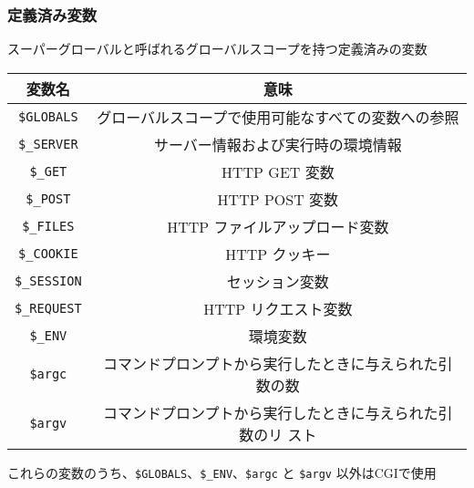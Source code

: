 \begin{frame}[containsverbatim]
\frametitle{定義済み変数}
スーパーグローバルと呼ばれるグローバルスコープを持つ定義済みの変数
\begin{center}\small
 \begin{tabular}{|c|c|}\hline
  変数名& 意味\\\hline
\verb+$GLOBALS+ & グローバルスコープで使用可能なすべての変数への参照\\\hline
\verb+$_SERVER+ & サーバー情報および実行時の環境情報\\\hline
\verb+$_GET+ & HTTP GET 変数\\\hline
\verb+$_POST+ & HTTP POST 変数\\\hline
\verb+$_FILES+ & HTTP ファイルアップロード変数\\\hline
\verb+$_COOKIE+ & HTTP クッキー\\\hline
\verb+$_SESSION+ &セッション変数 \\\hline
\verb+$_REQUEST+ & HTTP リクエスト変数\\\hline
\verb+$_ENV+  &  環境変数\\\hline
\verb+$argc+  &  コマンドプロンプトから実行したときに与えられた引数の数\\\hline
\verb+$argv+  &  コマンドプロンプトから実行したときに与えられた引数のリ
      スト\\\hline
\end{tabular}
\end{center}
これらの変数のうち、\verb+$GLOBALS+、\verb+$_ENV+、\verb+$argc+ と
\verb+$argv+  以外はCGIで使用
\end{frame}
